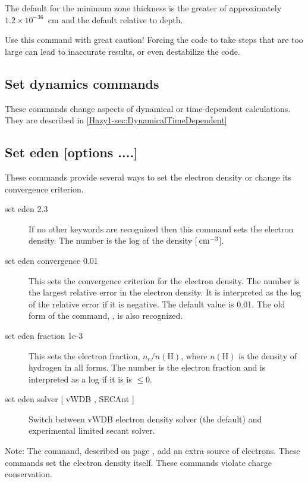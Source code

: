 The default for the minimum zone thickness is the greater of approximately 
$1.2 \times 10^{-36}$~cm and the default relative to depth.

Use this command with great caution! Forcing the code to take steps that are too large
can lead to inaccurate results, or even destabilize the code.

\subsection{Set dynamics commands}

These commands change aspects of dynamical or time-dependent calculations.
They are described in 
\ref{Hazy1-sec:DynamicalTimeDependent}

\subsection{Set eden [options ....]}
\label{sec:CommandSetEden}
These commands provide several ways to set the electron density
or change its convergence criterion.

\begin{description}

\item[set eden 2.3]   If no other keywords are recognized then this command
sets the electron density.
The number is the log of the density [${\rm\thinspace cm^{-3}}$].

\item[set eden convergence 0.01]
This sets the convergence criterion for the electron density.
The number is the largest relative error in the electron density.
It is interpreted as the log of the relative error if it is negative.
The default value is 0.01.
The old form of the command,
, is also recognized.

\item[set eden fraction 1e-3]
This sets the electron fraction, $n_e / n(\mathrm{H})$,
where $n(\mathrm{H})$ is the density of hydrogen in all forms.
The number is the electron fraction and is interpreted as a log if it is is $\leq 0$.

\item[set eden solver [ vWDB , SECAnt {]} ]
Switch between vWDB electron density solver (the default) and experimental
limited secant solver.

\end{description}

Note:  The  command,
described on page \pageref{sec:CommandEden}, add an extra source
of electrons.
These  commands set the electron density itself.
These commands violate charge conservation.

